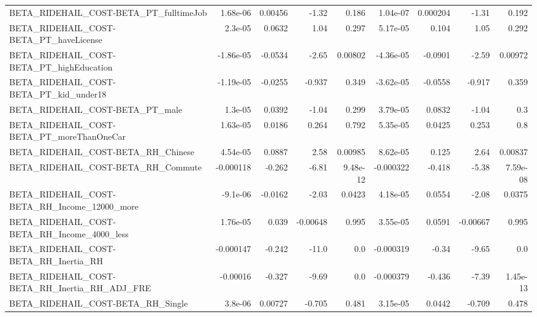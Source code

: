 \begin{tabular}{lrrrrrrrr}
BETA\_RIDEHAIL\_COST-BETA\_PT\_fulltimeJob             &    1.68e-06 &      0.00456 &    -1.32 &    0.186 &   1.04e-07 &    0.000204 &        -1.31 &         0.192 \\
BETA\_RIDEHAIL\_COST-BETA\_PT\_haveLicense             &     2.3e-05 &       0.0632 &     1.04 &    0.297 &   5.17e-05 &       0.104 &         1.05 &         0.292 \\
BETA\_RIDEHAIL\_COST-BETA\_PT\_highEducation           &   -1.86e-05 &      -0.0534 &    -2.65 &  0.00802 &  -4.36e-05 &     -0.0901 &        -2.59 &       0.00972 \\
BETA\_RIDEHAIL\_COST-BETA\_PT\_kid\_under18             &   -1.19e-05 &      -0.0255 &   -0.937 &    0.349 &  -3.62e-05 &     -0.0558 &       -0.917 &         0.359 \\
BETA\_RIDEHAIL\_COST-BETA\_PT\_male                    &     1.3e-05 &       0.0392 &    -1.04 &    0.299 &   3.79e-05 &      0.0832 &        -1.04 &           0.3 \\
BETA\_RIDEHAIL\_COST-BETA\_PT\_moreThanOneCar          &    1.63e-05 &       0.0186 &    0.264 &    0.792 &   5.35e-05 &      0.0425 &        0.253 &           0.8 \\
BETA\_RIDEHAIL\_COST-BETA\_RH\_Chinese                 &    4.54e-05 &       0.0887 &     2.58 &  0.00985 &   8.62e-05 &       0.125 &         2.64 &       0.00837 \\
BETA\_RIDEHAIL\_COST-BETA\_RH\_Commute                 &   -0.000118 &       -0.262 &    -6.81 & 9.48e-12 &  -0.000322 &      -0.418 &        -5.38 &      7.59e-08 \\
BETA\_RIDEHAIL\_COST-BETA\_RH\_Income\_12000\_more       &    -9.1e-06 &      -0.0162 &    -2.03 &   0.0423 &   4.18e-05 &      0.0554 &        -2.08 &        0.0375 \\
BETA\_RIDEHAIL\_COST-BETA\_RH\_Income\_4000\_less        &    1.76e-05 &        0.039 & -0.00648 &    0.995 &   3.55e-05 &      0.0591 &     -0.00667 &         0.995 \\
BETA\_RIDEHAIL\_COST-BETA\_RH\_Inertia\_RH              &   -0.000147 &       -0.242 &    -11.0 &      0.0 &  -0.000319 &       -0.34 &        -9.65 &           0.0 \\
BETA\_RIDEHAIL\_COST-BETA\_RH\_Inertia\_RH\_ADJ\_FRE      &    -0.00016 &       -0.327 &    -9.69 &      0.0 &  -0.000379 &      -0.436 &        -7.39 &      1.45e-13 \\
BETA\_RIDEHAIL\_COST-BETA\_RH\_Single                  &     3.8e-06 &      0.00727 &   -0.705 &    0.481 &   3.15e-05 &      0.0442 &       -0.709 &         0.478 \\

\end{tabular}
